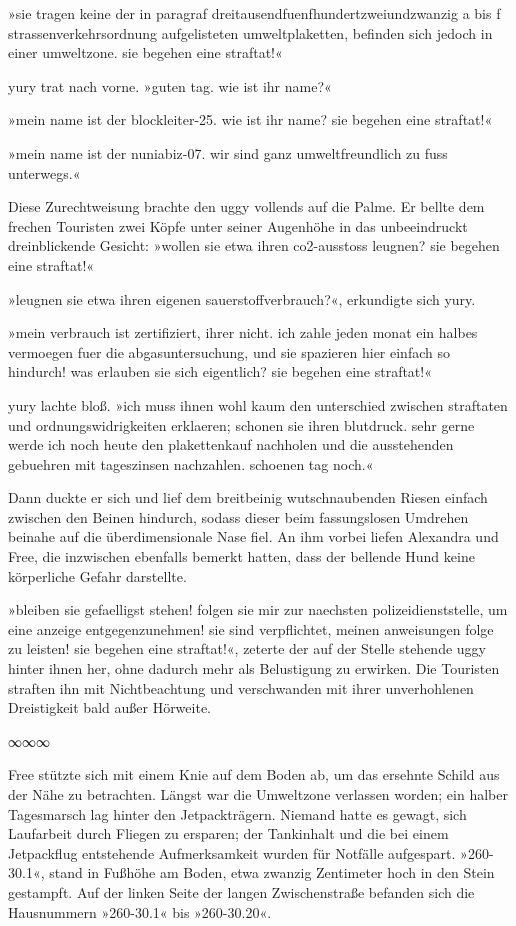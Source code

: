 »sie tragen keine der in paragraf dreitausendfuenfhundertzweiundzwanzig a bis f strassenverkehrsordnung aufgelisteten umweltplaketten, befinden sich jedoch in einer umweltzone. sie begehen eine straftat!«

yury trat nach vorne. »guten tag. wie ist ihr name?«

»mein name ist der blockleiter-25. wie ist ihr name? sie begehen eine straftat!«

»mein name ist der nuniabiz-07. wir sind ganz umweltfreundlich zu fuss unterwegs.«

Diese Zurechtweisung brachte den uggy vollends auf die Palme. Er bellte dem frechen Touristen zwei Köpfe unter seiner Augenhöhe in das unbeeindruckt dreinblickende Gesicht: »wollen sie etwa ihren co2-ausstoss leugnen? sie begehen eine straftat!«

»leugnen sie etwa ihren eigenen sauerstoffverbrauch?«, erkundigte sich yury.

»mein verbrauch ist zertifiziert, ihrer nicht. ich zahle jeden monat ein halbes vermoegen fuer die abgasuntersuchung, und sie spazieren hier einfach so hindurch! was erlauben sie sich eigentlich? sie begehen eine straftat!«

yury lachte bloß. »ich muss ihnen wohl kaum den unterschied zwischen straftaten und ordnungswidrigkeiten erklaeren; schonen sie ihren blutdruck. sehr gerne werde ich noch heute den plakettenkauf nachholen und die ausstehenden gebuehren mit tageszinsen nachzahlen. schoenen tag noch.«

Dann duckte er sich und lief dem breitbeinig wutschnaubenden Riesen einfach zwischen den Beinen hindurch, sodass dieser beim fassungslosen Umdrehen beinahe auf die überdimensionale Nase fiel. An ihm vorbei liefen Alexandra und Free, die inzwischen ebenfalls bemerkt hatten, dass der bellende Hund keine körperliche Gefahr darstellte.

»bleiben sie gefaelligst stehen! folgen sie mir zur naechsten polizeidienststelle, um eine anzeige entgegenzunehmen! sie sind verpflichtet, meinen anweisungen folge zu leisten! sie begehen eine straftat!«, zeterte der auf der Stelle stehende uggy hinter ihnen her, ohne dadurch mehr als Belustigung zu erwirken. Die Touristen straften ihn mit Nichtbeachtung und verschwanden mit ihrer unverhohlenen Dreistigkeit bald außer Hörweite.

\begin{center}
∞∞∞
\end{center}

Free stützte sich mit einem Knie auf dem Boden ab, um das ersehnte Schild aus der Nähe zu betrachten. Längst war die Umweltzone verlassen worden; ein halber Tagesmarsch lag hinter den Jetpackträgern. Niemand hatte es gewagt, sich Laufarbeit durch Fliegen zu ersparen; der Tankinhalt und die bei einem Jetpackflug entstehende Aufmerksamkeit wurden für Notfälle aufgespart. »260-30.1«, stand in Fußhöhe am Boden, etwa zwanzig Zentimeter hoch in den Stein gestampft. Auf der linken Seite der langen Zwischenstraße befanden sich die Hausnummern »260-30.1« bis »260-30.20«.

